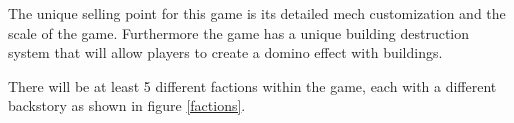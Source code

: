 \documentclass{tufte-handout}
\begin{document}
The unique selling point for this game is its detailed mech customization and the scale of the game. Furthermore the game has a unique building destruction system that will allow players to create a domino effect with buildings.

There will be at least 5 different factions within the game, each with a different backstory as shown in figure \ref{factions}. 
\end{document}
